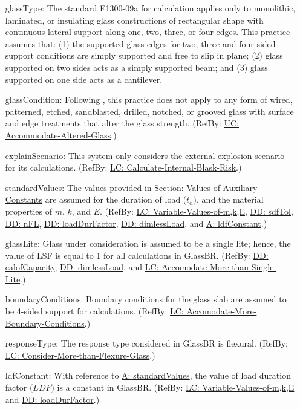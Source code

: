 \documentclass[12pt]{article}
\begin{document}
\begin{itemize}
\item[glassType:\phantomsection\label{assumpGT}]{The standard E1300-09a for calculation applies only to monolithic, laminated, or insulating glass constructions of rectangular shape with continuous lateral support along one, two, three, or four edges. This practice assumes that: (1) the supported glass edges for two, three and four-sided support conditions are simply supported and free to slip in plane; (2) glass supported on two sides acts as a simply supported beam; and (3) glass supported on one side acts as a cantilever.}
\item[glassCondition:\phantomsection\label{assumpGC}]{Following \cite[(pg. 1)]{astm2009}, this practice does not apply to any form of wired, patterned, etched, sandblasted, drilled, notched, or grooved glass with surface and edge treatments that alter the glass strength. (RefBy: \hyperref[accAlteredGlass]{UC: Accommodate-Altered-Glass}.)}
\item[explainScenario:\phantomsection\label{assumpES}]{This system only considers the external explosion scenario for its calculations. (RefBy: \hyperref[calcInternalBlastRisk]{LC: Calculate-Internal-Blask-Risk}.)}
\item[standardValues:\phantomsection\label{assumpSV}]{The values provided in \hyperref[Sec:AuxConstants]{Section: Values of Auxiliary Constants} are assumed for the duration of load (${t_{\text{d}}}$), and the material properties of $m$, $k$, and $E$. (RefBy: \hyperref[varValsOfmkE]{LC: Variable-Values-of-m,k,E}, \hyperref[DD:sdfTol]{DD: sdfTol}, \hyperref[DD:nFL]{DD: nFL}, \hyperref[DD:loadDurFactor]{DD: loadDurFactor}, \hyperref[DD:dimlessLoad]{DD: dimlessLoad}, and \hyperref[assumpLDFC]{A: ldfConstant}.)}
\item[glassLite:\phantomsection\label{assumpGL}]{Glass under consideration is assumed to be a single lite; hence, the value of LSF is equal to 1 for all calculations in GlassBR. (RefBy: \hyperref[DD:calofCapacity]{DD: calofCapacity}, \hyperref[DD:dimlessLoad]{DD: dimlessLoad}, and \hyperref[accMoreThanSingleLite]{LC: Accomodate-More-than-Single-Lite}.)}
\item[boundaryConditions:\phantomsection\label{assumpBC}]{Boundary conditions for the glass slab are assumed to be 4-sided support for calculations. (RefBy: \hyperref[accMoreBoundaryConditions]{LC: Accomodate-More-Boundary-Conditions}.)}
\item[responseType:\phantomsection\label{assumpRT}]{The response type considered in GlassBR is flexural. (RefBy: \hyperref[considerMoreThanFlexGlass]{LC: Consider-More-than-Flexure-Glass}.)}
\item[ldfConstant:\phantomsection\label{assumpLDFC}]{With reference to \hyperref[assumpSV]{A: standardValues}, the value of load duration factor ($LDF$) is a constant in GlassBR. (RefBy: \hyperref[varValsOfmkE]{LC: Variable-Values-of-m,k,E} and \hyperref[DD:loadDurFactor]{DD: loadDurFactor}.)}
\end{itemize}
\end{document}

